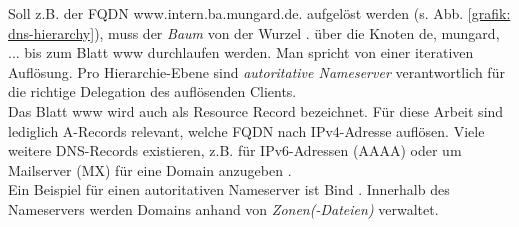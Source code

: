 Soll z.B. der \gls{FQDN} www.intern.ba.mungard.de. aufgelöst werden (s. Abb. \ref{grafik: dns-hierarchy}), muss der \textit{Baum} von der Wurzel \glqq .\grqq{} über die Knoten \glqq de\grqq{}, \glqq mungard\grqq{}, ... bis zum Blatt \glqq www\grqq{} durchlaufen werden. Man spricht von einer iterativen Auflösung. Pro Hierarchie-Ebene sind \textit{autoritative Nameserver} verantwortlich für die richtige Delegation des auflösenden \gls{Client}s.\\
Das Blatt \glqq www\grqq{} wird auch als Resource Record bezeichnet. Für diese Arbeit sind lediglich A-Records relevant, welche \gls{FQDN} nach IPv4-Adresse auflösen. Viele weitere \gls{DNS}-Records existieren, z.B. für IPv6-Adressen (AAAA) oder um Mailserver (MX) für eine Domain anzugeben \cite[S.528]{Fall2011}.\\
Ein Beispiel für einen autoritativen Nameserver ist Bind \cite{liu2006dns}. Innerhalb des Nameservers werden Domains anhand von \textit{Zonen(-Dateien)} verwaltet.
\newpage
